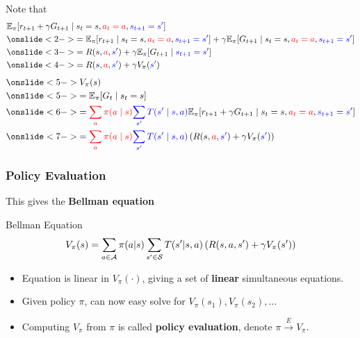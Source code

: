 \begin{frame}
	Note that
	\begin{align*}
	& \mathbb{E}_\pi[r_{t+1} + \gamma G_{t+1} \mid s_t = s, \red{a_t = a}, \blue{s_{t+1} = s'}] \\
	&\onslide<2->{= \mathbb{E}_\pi[r_{t+1} \mid s_t = s, \red{a_t = a}, \blue{s_{t+1} = s'}]
	+ \gamma \mathbb{E}_\pi[G_{t+1} \mid s_t = s, \red{a_t = a}, \blue{s_{t+1} = s'}]} \\ 
	&\onslide<3->{= R(s,\red{a},\blue{s'})
	+ \gamma \mathbb{E}_\pi[G_{t+1} \mid \blue{s_{t+1} = s'}]} \\ 
	&\onslide<4->{= R(s,\red{a},\blue{s'})
	+ \gamma V_\pi(\blue{s'})}
	\end{align*}
	\onslide<5->{hence}
	\begin{align*}
    &\onslide<5->{V_\pi(s)}\\  &\onslide<5->{= \mathbb{E}_\pi [G_t \mid s_t = s]}\\
	&\onslide<6->{= \red{\sum_a \pi(a \mid s)} \blue{\sum_{s'} T(s' \mid s,a)} \mathbb{E}_\pi [r_{t+1} + \gamma G_{t+1} \mid s_t = s, \red{a_t = a}, \blue{s_{t+1} = s'}]} \\
	&\onslide<7->{= \red{\sum_a \pi(a \mid s)} \blue{\sum_{s'} T(s' \mid s,a)} \left( R(s,\red{a},\blue{s'})
	+ \gamma V_\pi(\blue{s'}) \right)}
	\end{align*}



\end{frame}



\begin{frame}
	\frametitle{Policy Evaluation}
	This gives the \textbf{Bellman equation}
	\begin{block}{Bellman Equation}
		$$
		V_\pi(s) = \sum_{a \in \mathcal{A}} \pi(a | s) \sum_{s' \in \mathcal{S}} T(s' | s, a) \left( R(s,a,s') + \gamma V_\pi(s') \right) 
		$$
	\end{block}

\begin{itemize}
	\pause
\item Equation is linear in $V_{\pi}(\cdot)$, 
giving a set of \textbf{linear} simultaneous equations.
\pause
\item Given policy $\pi$, can now easy solve for $V_{\pi}(s_1), V_{\pi}(s_2), \ldots$
\pause
\item Computing $V_\pi$ from $\pi$ is called \textbf{policy evaluation}, denote $\pi \overset{E}{\rightarrow} V_\pi$.
\end{itemize}
\end{frame}

